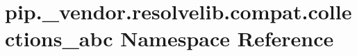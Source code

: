 \hypertarget{namespacepip_1_1__vendor_1_1resolvelib_1_1compat_1_1collections__abc}{}\section{pip.\+\_\+vendor.\+resolvelib.\+compat.\+collections\+\_\+abc Namespace Reference}
\label{namespacepip_1_1__vendor_1_1resolvelib_1_1compat_1_1collections__abc}
